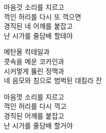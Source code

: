 마음것 소리를 지르고\\

꺽인 허리를 다시 또 꺽으면\\

경직된 네 어깨를 붙잡고\\

난 시가를 줄담배 할테야



메탄올 칵테일과\\

콧속을 메운 코카인과\\

시커멓게 뚫린 정맥과\\

네 음모와 침으로 범벅된 데킬라 잔



마음껏 소리를 지르고\\

꺽인 허리를 다시 꺽고\\

경직된 어깨를 붙잡고\\

난 시가를 줄담배 할거야

